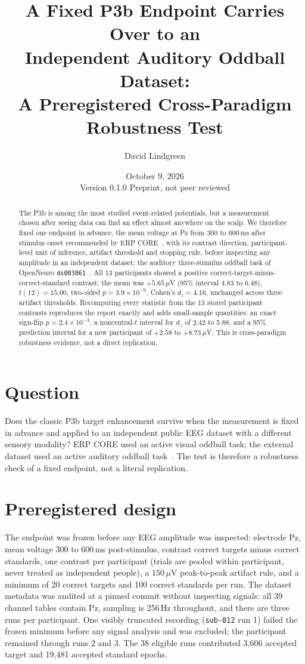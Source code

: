 \documentclass[11pt]{article}
\title{A Fixed P3b Endpoint Carries Over to an\\
Independent Auditory Oddball Dataset:\\
A Preregistered Cross-Paradigm Robustness Test}
\author{David Lindgreen}
\date{October 9, 2026 \\[2pt] \small Version 0.1.0 \quad Preprint, not peer reviewed}
\begin{document}
\maketitle

\begin{abstract}
The P3b is among the most studied event-related potentials, but a measurement chosen after seeing data can find an effect
almost anywhere on the scalp. We therefore fixed one endpoint in advance, the mean voltage at Pz from 300 to 600\,ms after
stimulus onset recommended by ERP CORE~\cite{kappenman2021}, with its contrast direction, participant-level unit of
inference, artifact threshold and stopping rule, before inspecting any amplitude in an independent dataset: the auditory
three-stimulus oddball task of OpenNeuro \texttt{ds003061}~\cite{delorme2021}. All 13 participants showed a positive
correct-target-minus-correct-standard contrast; the mean was $+5.65\,\mu$V (95\% interval 4.83 to 6.48),
$t(12)=15.00$, two-sided $p=3.9\times10^{-9}$, Cohen's $d_z=4.16$, unchanged across three artifact thresholds. Recomputing every
statistic from the 13 stored participant contrasts reproduces the report exactly and adds small-sample quantities: an exact
sign-flip $p=2.4\times10^{-4}$, a noncentral-$t$ interval for $d_z$ of 2.42 to 5.88, and a 95\% prediction interval for a new
participant of $+2.58$ to $+8.73\,\mu$V. This is cross-paradigm robustness evidence, not a direct replication.
\end{abstract}

\section{Question}
Does the classic P3b target enhancement survive when the measurement is fixed in advance and applied to an independent public
EEG dataset with a different sensory modality? ERP CORE used an active visual oddball task; the external dataset used an
active auditory oddball task~\cite{pernet2019}. The test is therefore a robustness check of a fixed endpoint, not a literal replication.

\section{Preregistered design}
The endpoint was frozen before any EEG amplitude was inspected: electrode Pz, mean voltage 300 to 600\,ms post-stimulus, contrast
correct targets minus correct standards, one contrast per participant (trials are pooled within participant, never treated as
independent people), a $150\,\mu$V peak-to-peak artifact rule, and a minimum of 20 correct targets and 100 correct standards per
run. The dataset metadata was audited at a pinned commit without inspecting signals: all 39 channel tables contain Pz, sampling is
256\,Hz throughout, and there are three runs per participant. One visibly truncated recording (\texttt{sub-012} run 1) failed the
frozen minimum before any signal analysis and was excluded; the participant remained through runs 2 and 3. The 38 eligible runs
contributed 3{,}606 accepted target and 19{,}481 accepted standard epochs.
\end{document}

